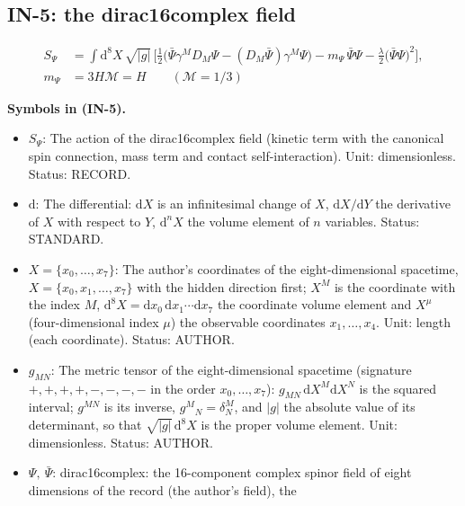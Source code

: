 \documentclass[
  10pt,
]{article}
\providecommand{\tightlist}{%
  \setlength{\itemsep}{0pt}\setlength{\parskip}{0pt}}
\begin{document}
\hypertarget{in-5-the-dirac16complex-field}{%
\subsection{IN-5: the dirac16complex
field}\label{in-5-the-dirac16complex-field}}

\[
\begin{aligned}
S_\Psi &= \int\mathrm{d}^8X\,\sqrt{\lvert g\rvert}\,\Big[\tfrac12\big(\bar\Psi\gamma^MD_M\Psi
 - (D_M\bar\Psi)\gamma^M\Psi\big) - m_\Psi\,\bar\Psi\Psi - \frac{\lambda}{2}\big(\bar\Psi\Psi\big)^2\Big],\\
m_\Psi &= 3H\mathcal{M} = H\qquad (\mathcal{M} = 1/3)
\end{aligned} \tag{IN-5}
\]

\textbf{Symbols in (IN-5).}

\begin{itemize}
\tightlist
\item
  \(S_\Psi\): The action of the dirac16complex field (kinetic term with
  the canonical spin connection, mass term and contact
  self-interaction). Unit: dimensionless. Status: RECORD.
\item
  \(\mathrm{d}\): The differential: \(\mathrm{d}X\) is an infinitesimal
  change of \(X\), \(\mathrm{d}X/\mathrm{d}Y\) the derivative of \(X\)
  with respect to \(Y\), \(\mathrm{d}^nX\) the volume element of \(n\)
  variables. Status: STANDARD.
\item
  \(X = \{x_0, \dots, x_7\}\): The author's coordinates of the
  eight-dimensional spacetime, \(X = \{x_0, x_1, \dots, x_7\}\) with the
  hidden direction first; \(X^M\) is the coordinate with the index
  \(M\),
  \(\mathrm{d}^8X = \mathrm{d}x_0\,\mathrm{d}x_1\cdots\mathrm{d}x_7\)
  the coordinate volume element and \(X^\mu\) (four-dimensional index
  \(\mu\)) the observable coordinates \(x_1, \dots, x_4\). Unit: length
  (each coordinate). Status: AUTHOR.
\item
  \(g_{MN}\): The metric tensor of the eight-dimensional spacetime
  (signature \(+,+,+,+,-,-,-,-\) in the order \(x_0, \dots, x_7\)):
  \(g_{MN}\,\mathrm{d}X^M\mathrm{d}X^N\) is the squared interval;
  \(g^{MN}\) is its inverse, \(g^M{}_N = \delta^M_N\), and
  \(\lvert g\rvert\) the absolute value of its determinant, so that
  \(\sqrt{\lvert g\rvert}\,\mathrm{d}^8X\) is the proper volume element.
  Unit: dimensionless. Status: AUTHOR.
\item
  \(\Psi,\ \bar\Psi\): dirac16complex: the 16-component complex spinor
  field of eight dimensions of the record (the author's field), the

\end{itemize}
\end{document}
